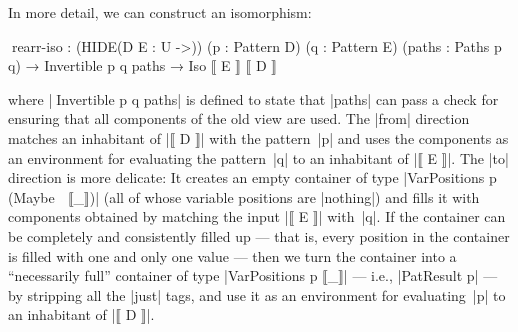 \documentclass{sigplanconf}
\begin{document}
In more detail, we can construct an isomorphism:
\begin{code}
^^^rearr-iso : (HIDE({D E : U} ->))
  (p : Pattern D) (q : Pattern E) (paths : Paths p q) →
  Invertible p q paths → Iso ⟦ E ⟧ ⟦ D ⟧
\end{code}
where |^^^Invertible p q paths| is defined to state that |paths| can pass a check for ensuring that all components of the old view are used.
The |from| direction matches an inhabitant of |⟦ D ⟧| with the pattern~|p| and uses the components as an environment for evaluating the pattern~|q| to an inhabitant of |⟦ E ⟧|.
The |to| direction is more delicate:
It creates an empty container of type |VarPositions p (Maybe ∘ ⟦_⟧)| (all of whose variable positions are |nothing|) and fills it with components obtained by matching the input |⟦ E ⟧| with~|q|.
If the container can be completely and consistently filled up --- that is, every position in the container is filled with one and only one value --- then we turn the container into a ``necessarily full'' container of type |VarPositions p ⟦_⟧| --- i.e., |PatResult p| --- by stripping all the |just| tags, and use it as an environment for evaluating~|p| to an inhabitant of |⟦ D ⟧|.
\end{document}
